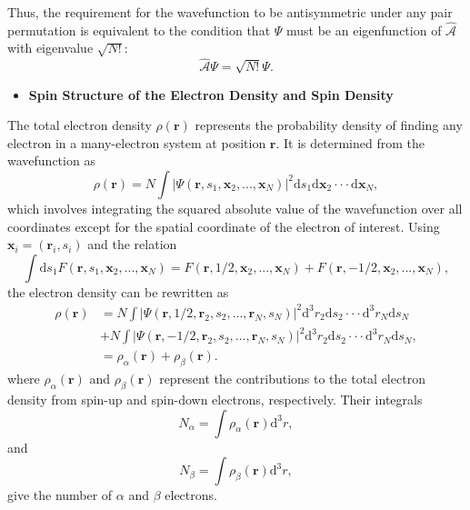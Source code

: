 \documentclass[%
 preprint, linenumbers,
 amsmath,amssymb,
 aps, physrev,
]{revtex4-2}
\begin{document}
Thus, the requirement for the wavefunction to be antisymmetric under any pair permutation is equivalent to the condition that $\Psi$ must be an eigenfunction of $\hat{\mathcal{A}}$ with eigenvalue $\sqrt{N!}$:
\begin{equation}
    \hat{\mathcal{A}}\Psi = \sqrt{N!}\Psi.
\end{equation}

\begin{itemize}
     \item \textbf{Spin Structure of the Electron Density and Spin Density}
\end{itemize}

The total electron density $\rho(\mathbf{r})$ represents the probability density of finding any electron in a many-electron system at position $\mathbf{r}$. It is determined from the wavefunction as
\begin{equation}
    \rho(\mathbf{r}) = N\int |\Psi(\mathbf{r},s_1,\mathbf{x}_2,...,\mathbf{x}_N)|^2\mathrm{d}s_1\mathrm{d}\mathbf{x}_2\cdot\cdot\cdot\mathrm{d}\mathbf{x}_N,
\end{equation}
which involves integrating the squared absolute value of the wavefunction over all coordinates except for the spatial coordinate of the electron of interest. Using $\mathbf{x}_i=(\mathbf{r}_i,s_i)$ and the relation
\begin{equation}
    \int\mathrm{d}s_1F(\mathbf{r},s_1,\mathbf{x}_2,...,\mathbf{x}_N) = F(\mathbf{r},1/2,\mathbf{x}_2,...,\mathbf{x}_N) + F(\mathbf{r},-1/2,\mathbf{x}_2,...,\mathbf{x}_N),
    \label{eq:2}
\end{equation}
the electron density can be rewritten as
\begin{align*}
    \rho(\mathbf{r}) &= N\int |\Psi(\mathbf{r},1/2,\mathbf{r}_2,s_2,...,\mathbf{r}_N,s_N)|^2\mathrm{d}^3r_2\mathrm{d}s_2\cdot\cdot\cdot\mathrm{d}^3r_N\mathrm{d}s_N\\
    &+ N\int |\Psi(\mathbf{r},-1/2,\mathbf{r}_2,s_2,...,\mathbf{r}_N,s_N)|^2\mathrm{d}^3r_2\mathrm{d}s_2\cdot\cdot\cdot\mathrm{d}^3r_N\mathrm{d}s_N, \\
    &= \rho_{\alpha}(\mathbf{r}) + \rho_{\beta}(\mathbf{r}).
\end{align*}
where $\rho_{\alpha}(\mathbf{r})$ and $\rho_{\beta}(\mathbf{r})$ represent the contributions to the total electron density from spin-up and spin-down electrons, respectively. Their integrals
\begin{equation}
    N_{\alpha} = \int\rho_{\alpha}(\mathbf{r})\mathrm{d}^3r,
\end{equation}
and
\begin{equation}
    N_{\beta} = \int\rho_{\beta}(\mathbf{r})\mathrm{d}^3r,
\end{equation}
give the number of $\alpha$ and $\beta$ electrons.\\
\end{document}
